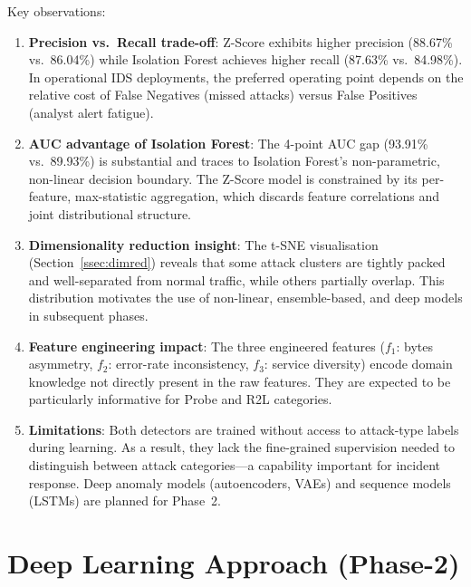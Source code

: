 \documentclass[conference]{IEEEtran}
\begin{document}
Key observations:
\begin{enumerate}
  \item \textbf{Precision vs.\ Recall trade-off}: Z-Score exhibits higher precision
        (88.67\% vs.\ 86.04\%) while Isolation Forest achieves higher recall (87.63\%
        vs.\ 84.98\%).  In operational IDS deployments, the preferred operating point
        depends on the relative cost of False Negatives (missed attacks) versus False
        Positives (analyst alert fatigue).

  \item \textbf{AUC advantage of Isolation Forest}: The 4-point AUC gap (93.91\%
        vs.\ 89.93\%) is substantial and traces to Isolation Forest's non-parametric,
        non-linear decision boundary.  The Z-Score model is constrained by its
        per-feature, max-statistic aggregation, which discards feature correlations
        and joint distributional structure.

  \item \textbf{Dimensionality reduction insight}: The t-SNE visualisation
        (Section~\ref{ssec:dimred}) reveals that some attack clusters are tightly
        packed and well-separated from normal traffic, while others partially overlap.
        This distribution motivates the use of non-linear, ensemble-based, and deep
        models in subsequent phases.

  \item \textbf{Feature engineering impact}: The three engineered features
        ($f_1$: bytes asymmetry, $f_2$: error-rate inconsistency, $f_3$: service
        diversity) encode domain knowledge not directly present in the raw features.
        They are expected to be particularly informative for Probe and R2L categories.

  \item \textbf{Limitations}: Both detectors are trained without access to
        attack-type labels during learning.  As a result, they lack the fine-grained
        supervision needed to distinguish between attack categories---a capability
        important for incident response.  Deep anomaly models (autoencoders, VAEs) and
        sequence models (LSTMs) are planned for Phase~2.
\end{enumerate}

\section{Deep Learning Approach (Phase-2)}
\label{sec:phase2_dl}
\end{document}
